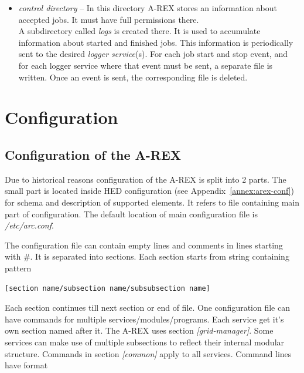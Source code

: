 \documentclass{article}                            %
\begin{document}

\begin{itemize}
\item \textit{control directory} -- In this directory A-REX stores an information
about accepted jobs. It must have full permissions there.\\
A subdirectory called \textit{logs} is created there. It is used to
accumulate information about started and finished jobs. This information
is periodically sent to the desired \emph{logger service}(s). For
each job start and stop event, and for each logger service where that
event must be sent, a separate file is written. Once an event is sent,
the corresponding file is deleted.
\end{itemize}

\section{Configuration}

\subsection{Configuration of the A-REX\label{SubSection:ConfigFile}}

Due to historical reasons configuration of the A-REX is split into
2 parts. The small part is located inside HED configuration (see Appendix~\ref{annex:arex-conf}) for schema and description of supported elements. It refers to
file containing main part of configuration. The default location of
main configuration file is \textit{/etc/arc.conf}.

The configuration file can contain empty lines and comments in lines
starting with \#. It is separated into sections. Each section starts
from string containing pattern

\begin{shaded}
\verb|[section name/subsection name/subsubsection name]|
\end{shaded}

Each section continues till next section or end of file. One configuration
file can have commands for multiple services/modules/programs. Each
service get it's own section named after it. The A-REX uses section
\emph{{[}grid-manager]}. Some services can make use of multiple subsections
to reflect their internal modular structure. Commands in section \emph{{[}common]}
apply to all services. Command lines have format 
\end{document}

